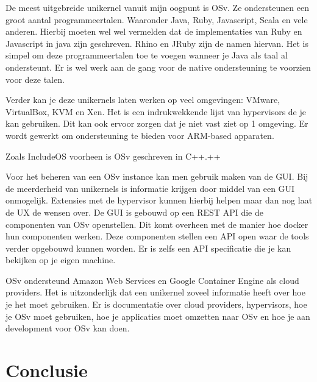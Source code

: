 \documentclass[pdftex,a4paper,12pt,twoside]{report}
\begin{document}
De meest uitgebreide unikernel vanuit mijn oogpunt is OSv. Ze ondersteunen een groot aantal programmeertalen. Waaronder Java, Ruby, Javascript, Scala en vele anderen. Hierbij moeten wel wel vermelden dat de implementaties van Ruby en Javascript in java zijn geschreven. Rhino en JRuby zijn de namen hiervan. Het is simpel om deze programmeertalen toe te voegen wanneer je Java als taal al ondersteunt. Er is wel werk aan de gang voor de native ondersteuning te voorzien voor deze talen.

Verder kan je deze unikernels laten werken op veel omgevingen: VMware, VirtualBox, KVM en Xen. Het is een indrukwekkende lijst van hypervisors de je kan gebruiken. Dit kan ook ervoor zorgen dat je niet vast ziet op 1 omgeving. Er wordt gewerkt om ondersteuning te bieden voor ARM-based apparaten.

Zoals IncludeOS voorheen is OSv geschreven in C++.++

Voor het beheren van een OSv instance kan men gebruik maken van de GUI. Bij de meerderheid van unikernels is informatie krijgen door middel van een GUI onmogelijk. Extensies met de hypervisor kunnen hierbij helpen maar dan nog laat de UX de wensen over. De GUI is gebouwd op een REST API die de componenten van OSv openstellen. Dit komt overheen met de manier hoe docker hun componenten werken. Deze componenten stellen een API open waar de tools verder opgebouwd kunnen worden. Er is zelfs een API specificatie die je kan bekijken op je eigen machine.

OSv ondersteund Amazon Web Services en Google Container Engine als cloud providers. Het is uitzonderlijk dat een unikernel zoveel informatie heeft over hoe je het moet gebruiken. Er is documentatie over cloud providers, hypervisors, hoe je OSv moet gebruiken, hoe je applicaties moet omzetten naar OSv en hoe je aan development voor OSv kan doen.  

\chapter{Conclusie}
\label{ch:conclusie}







\listoffigures
\listoftables
\end{document}
